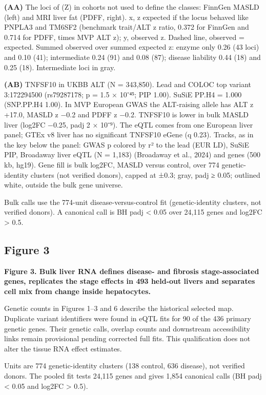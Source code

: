 \textbf{(AA)} The loci of (Z) in cohorts not used to define the classes: FinnGen MASLD (left) and MRI liver fat (PDFF, right). x, z expected if the locus behaved like PNPLA3 and TM6SF2 (benchmark trait/ALT z ratio, 0.372 for FinnGen and 0.714 for PDFF, times MVP ALT z); y, observed z. Dashed line, observed = expected. Summed observed over summed expected z: enzyme only 0.26 (43 loci) and 0.10 (41); intermediate 0.24 (91) and 0.08 (87); disease liability 0.44 (18) and 0.25 (18). Intermediate loci in gray.

\textbf{(AB)} TNFSF10 in UKBB ALT (N = 343,850). Lead and COLOC top variant 3:172294500 (rs79287178; p = 1.5 × 10⁻⁴⁵; PIP 1.00). SuSiE PP.H4 = 1.000 (SNP.PP.H4 1.00). In MVP European GWAS the ALT-raising allele has ALT z +17.0, MASLD z −0.2 and PDFF z −0.2. TNFSF10 is lower in bulk MASLD liver (log2FC −0.25, padj 2 × 10⁻⁹). The eQTL comes from one European liver panel; GTEx v8 liver has no significant TNFSF10 eGene (q 0.23). Tracks, as in the key below the panel: GWAS p colored by r² to the lead (EUR LD), SuSiE PIP, Broadaway liver eQTL (N = 1,183) (Broadaway et al., 2024) and genes (500 kb, hg19). Gene fill is bulk log2FC, MASLD versus control, over 774 genetic-identity clusters (not verified donors), capped at ±0.3; gray, padj ≥ 0.05; outlined white, outside the bulk gene universe.

Bulk calls use the 774-unit disease-versus-control fit (genetic-identity clusters, not verified donors). A canonical call is BH padj \textless{} 0.05 over 24,115 genes and \textbar log2FC\textbar{} \textgreater{} 0.5.

\subsection{Figure 3}\label{figure-3}

\textbf{Figure 3. Bulk liver RNA defines disease- and fibrosis stage-associated genes, replicates the stage effects in 493 held-out livers and separates cell mix from change inside hepatocytes.}

Genetic counts in Figures 1--3 and 6 describe the historical selected map.
Duplicate variant identifiers were found in eQTL fits for 90 of the 436
primary genetic genes. Their genetic calls, overlap counts and downstream
accessibility links remain provisional pending corrected full fits. This
qualification does not alter the tissue RNA effect estimates.

Units are 774 genetic-identity clusters (138 control, 636 disease), not verified donors. The pooled fit tests 24,115 genes and gives 1,854 canonical calls (BH padj \textless{} 0.05 and \textbar log2FC\textbar{} \textgreater{} 0.5).

